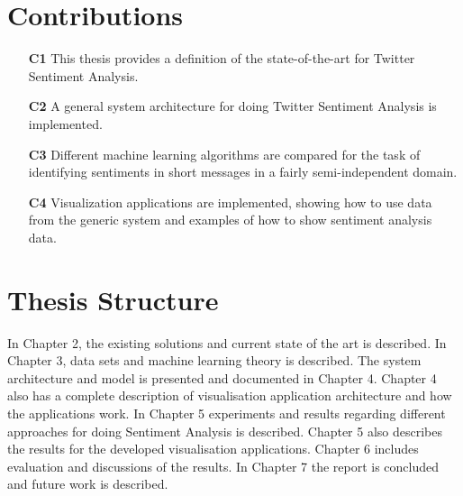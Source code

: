 	

\section{Contributions}
\label{sec:contribution}

\begin{itemize}
\item[\textbf{C1}] This thesis provides a definition of the state-of-the-art for Twitter Sentiment Analysis.

\item[\textbf{C2}] A general system architecture for doing Twitter Sentiment Analysis is implemented. 

\item[\textbf{C3}] Different machine learning algorithms are compared for the task of identifying sentiments in short messages in a fairly semi-independent domain.

\item[\textbf{C4}] Visualization applications are implemented, showing how to use data from the generic system and examples of how to show sentiment analysis data.
 
\end{itemize}

\section{Thesis Structure}
\label{sec:structure}

In Chapter 2, the existing solutions and current state of the art is described. In Chapter 3, data sets and machine learning theory is described. The system architecture and model is presented and documented in Chapter 4. Chapter 4 also has a complete description of visualisation application architecture and how the applications work. In Chapter 5 experiments and results regarding different approaches for doing Sentiment Analysis is described. Chapter 5 also describes the results for the developed visualisation applications. Chapter 6 includes evaluation and discussions of the results. In Chapter 7 the report is concluded and future work is described. 




